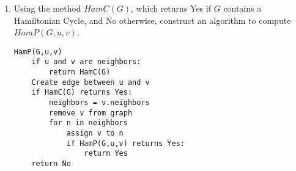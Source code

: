 \documentclass[12pt]{article}
\begin{document}
\begin{enumerate}
\item Using the method $HamC(G)$, which returns Yes if $G$ contains a
Hamiltonian Cycle, and No otherwise, construct an algorithm to compute
$HamP(G,u,v)$.

\begin{lstlisting}
HamP(G,u,v)
    if u and v are neighbors:
        return HamC(G)
    Create edge between u and v
    if HamC(G) returns Yes:
        neighbors = v.neighbors
        remove v from graph
        for n in neighbors
            assign v to n
            if HamP(G,u,v) returns Yes:
                return Yes
    return No

\end{lstlisting}

\end{enumerate}
\end{document}
